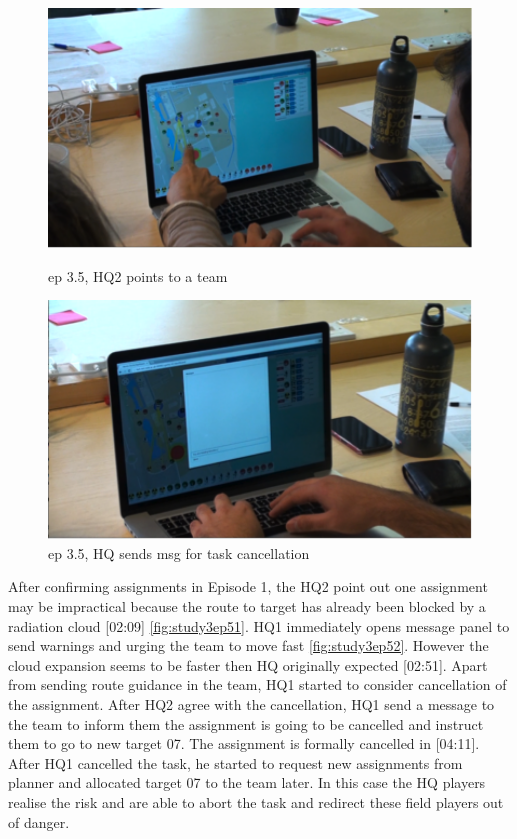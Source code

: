 \begin{figure}[ht]
\centering
\begin{minipage}[b]{0.45\linewidth}
\includegraphics[width=1\textwidth]{img/study3/ep51}
\caption{ep 3.5, HQ2 points to a team}
\label{fig:study3ep51}
\end{minipage}
\quad
\begin{minipage}[b]{0.45\linewidth}
 \includegraphics[width=1\textwidth]{img/study3/ep52}
\caption{ep 3.5, HQ sends msg for task cancellation}
\label{fig:study1ep52}
\end{minipage}
\end{figure}

After confirming assignments in Episode 1, the HQ2 point out one assignment may be impractical because the route to target has already been blocked by a radiation cloud [02:09] \ref{fig:study3ep51}. HQ1 immediately opens message panel to send warnings and urging the team to move fast \ref{fig:study3ep52}. However the cloud expansion seems to be faster then HQ originally expected [02:51]. Apart from sending route guidance in the team, HQ1 started to consider cancellation of the assignment. After HQ2 agree with the cancellation, HQ1 send a message to the team to inform them the assignment is going to be cancelled and instruct them to go to new target 07. The assignment is formally cancelled in [04:11]. After HQ1 cancelled the task, he started to request new assignments from planner and allocated target 07 to the team later. In this case the HQ players realise the risk and are able to abort the task and redirect these field players out of danger.\\

